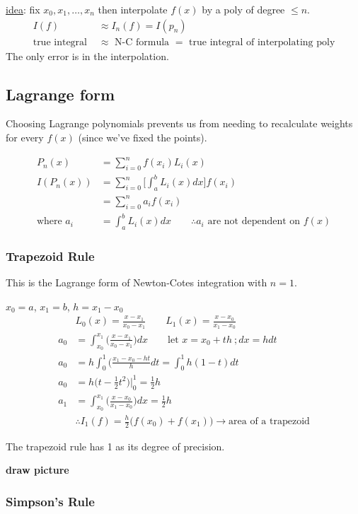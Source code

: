 \documentclass[12pt]{article}
\begin{document}
\underline{idea}: fix $x_0, x_1, \dots, x_n$ then interpolate $f(x)$ by a poly of degree $\leq n$.
%
\begin{align}
I(f) &\approx I_n(f) = I(p_n)\\
\text{true integral } &\approx \text{ N-C formula } = \text{ true integral of interpolating poly}
\end{align}
%
The only error is in the interpolation.

\subsection*{Lagrange form}
Choosing Lagrange polynomials prevents us from needing to recalculate weights for every $f(x)$ (since we've fixed the points).

\begin{align}
P_n(x) &= \sum_{i=0}^{n}f(x_i)L_i(x) \\
%
I(P_n(x)) &= \sum_{i=0}^{n} \bigl[ \int_a^b L_i(x)dx \bigr] f(x_i) \\
%
&= \sum_{i=0}^{n} a_i f(x_i)\\
\text{where } a_i &=  \int_a^b L_i(x)dx \qquad \therefore a_i \text{ are not dependent on } f(x)
\end{align}

\subsubsection{Trapezoid Rule}
This is the Lagrange form of Newton-Cotes integration with $n=1$.

$x_0 = a$, $x_1 = b$, $h = x_1 - x_0$
%
\begin{align}
&L_0(x) = \frac{x-x_1}{x_0-x_1} \qquad L_1(x) = \frac{x-x_0}{x_1-x_0} \\
%
a_0 &= \int_{x_0}^{x_1} \bigl(\frac{x-x_1}{x_0-x_1}\bigr) dx \qquad \text{let } x = x_0 + th \:; dx = hdt \\
%
a_0 &= h \int_0^1 \bigl(\frac{x_1 - x_0 - ht}{h}dt = \int_0^1 h(1-t)dt \\
%
a_0 &= h\bigl(t - \frac{1}{2}t^2 \bigr) |_0^1 = \frac{1}{2}h\\
%
a_1 &= \int_{x_0}^{x_1} \bigl(\frac{x-x_0}{x_1-x_0}\bigr) dx = \frac{1}{2}h\\
%
& \therefore I_1(f) = \frac{h}{2}\bigl(f(x_0) + f(x_1)\bigr) \rightarrow \text{area of a trapezoid}
\end{align}

The trapezoid rule has 1 as its degree of precision.

\textbf{draw picture}

\subsubsection{Simpson's Rule}
 
%
% 
\end{document}
